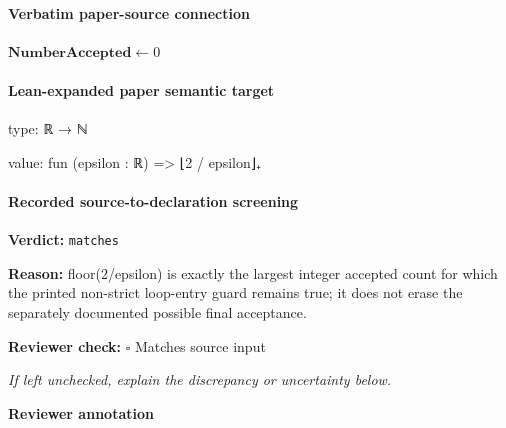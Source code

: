 \documentclass[10pt]{article}
\newcommand{\reviewerbox}{%
  \par\noindent\fbox{\parbox{0.96\linewidth}{\rule{0pt}{0.38in}}}\par
}
\newcommand{\reviewmatch}[1]{%
  \par\noindent\textbf{Reviewer check:} $\square$\; #1\par
  \noindent\emph{If left unchecked, explain the discrepancy or uncertainty below.}\par
}
\begin{document}
\paragraph{Verbatim paper-source connection}
\begin{ReviewVerbatim}
\begin{algorithm}
\ifdraft
\else
\small
\fi
{}
$\mathbf{NumberAccepted} \leftarrow 0$

\caption{CertificateChecker($\epsilon,D,U,(f_1,g_1,h_1),\ldots )$: An algorithm that takes as input a stream of submissions $(f_i,g_i,h_i)$ and checks if $(g_i,h_i)$ is a certificate of sub-optimality for $f_i$ with sufficiently high parameter values.}
\label{alg:checker}
\end{algorithm}
\end{ReviewVerbatim}



\paragraph{Lean-expanded paper semantic target}
\begin{ReviewVerbatim}
type:
ℝ → ℕ

value:
fun (epsilon : ℝ) => ⌊2 / epsilon⌋₊
\end{ReviewVerbatim}


\paragraph{Recorded source-to-declaration screening}
\textbf{Verdict:} \texttt{matches}
\\
{\raggedright
\textbf{Reason:} floor(2/\allowbreak{}epsilon) is exactly the largest integer accepted count for which the printed non-\allowbreak{}strict loop-\allowbreak{}entry guard remains true;\allowbreak{} it does not erase the separately documented possible final acceptance.\allowbreak{}
\par}
\reviewmatch{Matches source input}
\noindent\textbf{Reviewer annotation}\par
\reviewerbox
\clearpage
\hypertarget{paper-prerequisite-fb8517e52c6bc50a}{}
\end{document}
